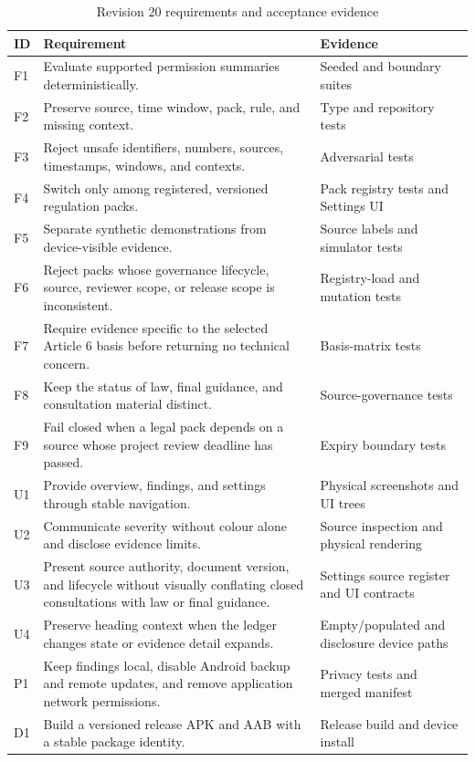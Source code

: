 \begin{table}[H]
\centering
\small
\caption{Revision 20 requirements and acceptance evidence}
\label{tab:r18-requirements}
\begin{tabular}{p{}p{}p{}}
\toprule
ID & Requirement & Evidence \\
\midrule
F1 & Evaluate supported permission summaries deterministically. & Seeded and boundary suites \\
F2 & Preserve source, time window, pack, rule, and missing context. & Type and repository tests \\
F3 & Reject unsafe identifiers, numbers, sources, timestamps, windows, and contexts. & Adversarial tests \\
F4 & Switch only among registered, versioned regulation packs. & Pack registry tests and Settings UI \\
F5 & Separate synthetic demonstrations from device-visible evidence. & Source labels and simulator tests \\
F6 & Reject packs whose governance lifecycle, source, reviewer scope, or release scope is inconsistent. & Registry-load and mutation tests \\
F7 & Require evidence specific to the selected Article 6 basis before returning no technical concern. & Basis-matrix tests \\
F8 & Keep the status of law, final guidance, and consultation material distinct. & Source-governance tests \\
F9 & Fail closed when a legal pack depends on a source whose project review deadline has passed. & Expiry boundary tests \\
U1 & Provide overview, findings, and settings through stable navigation. & Physical screenshots and UI trees \\
U2 & Communicate severity without colour alone and disclose evidence limits. & Source inspection and physical rendering \\
U3 & Present source authority, document version, and lifecycle without visually conflating closed consultations with law or final guidance. & Settings source register and UI contracts \\
U4 & Preserve heading context when the ledger changes state or evidence detail expands. & Empty/populated and disclosure device paths \\
P1 & Keep findings local, disable Android backup and remote updates, and remove application network permissions. & Privacy tests and merged manifest \\
D1 & Build a versioned release APK and AAB with a stable package identity. & Release build and device install \\
\bottomrule
\end{tabular}
\end{table}

